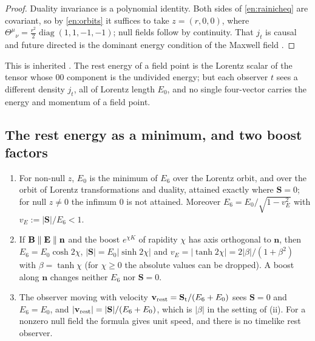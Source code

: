 \begin{proof}
Duality invariance is a polynomial identity. Both sides of \eqref{en:rainicheq} are covariant, so by \cref{en:orbits} it suffices to take
$z=(r,0,0)$, where $\Theta^\mu{}_\nu=\tfrac{r^2}2\operatorname{diag}(1,1,-1,-1)$; null fields follow by continuity. That $j_t$ is causal and future
directed is the dominant energy condition of the Maxwell field \cite{HawkingEllis73}.
\end{proof}

This is inherited \cite{Rainich1925,Synge56}. The rest energy of a field point is the Lorentz scalar of the tensor whose $00$ component is the
undivided energy; but each observer $t$ sees a different density $j_t$, all of Lorentz length $E_0$, and no single four-vector carries the
energy and momentum of a field point.

\subsection{The rest energy as a minimum, and two boost factors}
\label{sec:energy-min}

\begin{theorem}
\label{en:min}
\begin{enumerate}[label=(\roman*),leftmargin=2.2em]
\item For non-null $z$, $E_0$ is the minimum of $E_6$ over the Lorentz orbit, and over the orbit of Lorentz transformations and duality,
attained exactly where $\mathbf S=0$; for null $z\neq0$ the infimum $0$ is not attained. Moreover $E_6=E_0/\sqrt{1-v_E^2}$ with $v_E:=|\mathbf S|/E_6<1$.
\item If $\mathbf B\parallel\mathbf E\parallel\mathbf n$ and the boost $e^{\chi K}$ of rapidity $\chi$ has axis orthogonal to $\mathbf n$, then
$E_6=E_0\cosh2\chi$, $|\mathbf S|=E_0|\sinh2\chi|$ and $v_E=|\tanh2\chi|=2|\beta|/(1+\beta^2)$ with $\beta=\tanh\chi$ (for $\chi\ge0$ the absolute
values can be dropped). A boost along $\mathbf n$ changes
neither $E_6$ nor $\mathbf S=0$.
\item The observer moving with velocity $\mathbf v_{\rm rest}=\mathbf S_{\rm t}/(E_6+E_0)$ sees $\mathbf S=0$ and $E_6=E_0$, and
$|\mathbf v_{\rm rest}|=|\mathbf S|/(E_6+E_0)$, which is $|\beta|$ in the setting of (ii). For a nonzero null field the formula gives unit
speed, and there is no timelike rest observer.
\end{enumerate}
\end{theorem}

